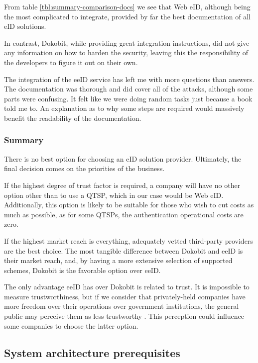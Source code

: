 From table \ref{tbl:summary-comparison-docs} we see that Web eID, although being the most complicated to integrate, provided by far the best documentation of all eID solutions.

In contrast, Dokobit, while providing great integration instructions, did not give any information on how to harden the security, leaving this the responsibility of the developers to figure it out on their own.

The integration of the eeID service has left me with more questions than answers. The documentation was thorough and did cover all of the attacks, although some parts were confusing. It felt like we were doing random tasks just because a book told me to. An explanation as to why some steps are required would massively benefit the readability of the documentation.

\subsubsection{Summary}

There is no best option for choosing an eID solution provider. Ultimately, the final decision comes on the priorities of the business.

If the highest degree of trust factor is required, a company will have no other option other than to use a QTSP, which in our case would be Web eID. Additionally, this option is likely to be suitable for those who wish to cut costs as much as possible, as for some QTSPs, the authentication operational costs are zero.

If the highest market reach is everything, adequately vetted third-party providers are the best choice. The most tangible difference between Dokobit and eeID is their market reach, and, by having a more extensive selection of supported schemes, Dokobit is the favorable option over eeID.

The only advantage eeID has over Dokobit is related to trust. It is impossible to measure trustworthiness, but if we consider that privately-held companies have more freedom over their operations over government institutions, the general public may perceive them as less trustworthy \cite{ha2004factors}. This perception could influence some companies to choose the latter option.

\subsection{System architecture prerequisites}

